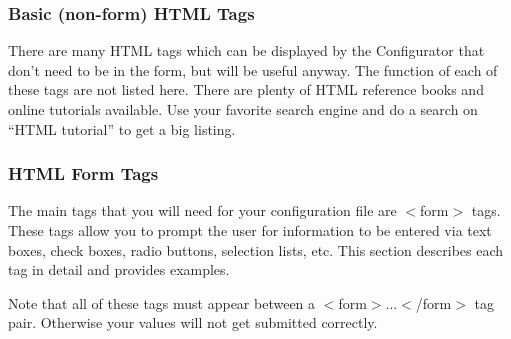 \subsubsection*{Basic (non-form) HTML Tags}

There are many HTML tags which can be displayed by the Configurator
that don't need to be in the form, but will be useful anyway. The
function of each of these tags are not listed here. There are plenty
of HTML reference books and online tutorials available. Use your favorite
search engine and do a search on {}``HTML tutorial'' to get a big
listing.


\subsubsection*{HTML Form Tags}

The main tags that you will need for your configuration file are $<$form$>$
tags. These tags allow you to prompt the user for information to be
entered via text boxes, check boxes, radio buttons, selection lists,
etc. This section describes each tag in detail and provides examples.

Note that all of these tags must appear between a $<$form$>$...$<$/form$>$
tag pair. Otherwise your values will not get submitted correctly.

